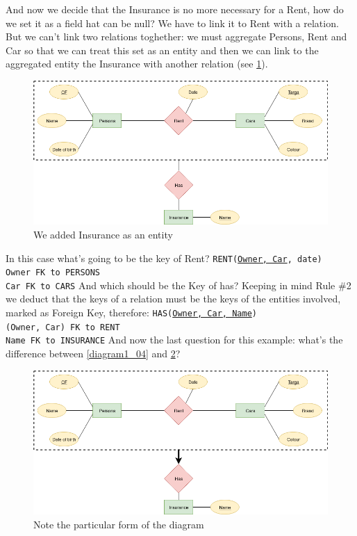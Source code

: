 \documentclass[class=book, crop=false, oneside]{standalone}
\newcommand\tab[1][1cm]{\hspace*{#1}}
\begin{document}
And now we decide that the Insurance is no more necessary for a Rent, how do we set it as a field hat can be null?
We have to link it to Rent with a relation.
But we can't link two relations toghether: we must aggregate Persons, Rent and Car so that we can treat this set as an entity and then we can link to the aggregated entity the Insurance with another relation (see \ref{diagram1_05}).
\begin{figure}[H]
	\includegraphics[width=\textwidth,keepaspectratio]{diagram1_05.png}
	\caption{We added Insurance as an entity}
	\label{diagram1_05}
\end{figure}
In this case what's going to be the key of Rent?
\vskip 10pt
\texttt{RENT(\underline{Owner, Car}, date)}\\
	\tab[.8cm] \texttt{Owner FK to PERSONS}\\
	\tab[.8cm] \texttt{Car FK to CARS}
\vskip 10pt
And which should be the Key of has?
Keeping in mind Rule \#2 we deduct that the keys of a relation must be the keys of the entities involved, marked as Foreign Key, therefore:
\vskip 10pt
\texttt{HAS(\underline{Owner, Car, Name})}\\
	\tab[.8cm] \texttt{(Owner, Car) FK to RENT}\\
	\tab[.8cm] \texttt{Name FK to INSURANCE}
\vskip 10pt
And now the last question for this example: what's the difference between \ref{diagram1_04} and \ref{diagram1_06}?
\begin{figure}[H]
	\includegraphics[width=\textwidth,keepaspectratio]{diagram1_06.png}
	\caption{Note the particular form of the diagram}
	\label{diagram1_06}
\end{figure}
\end{document}
